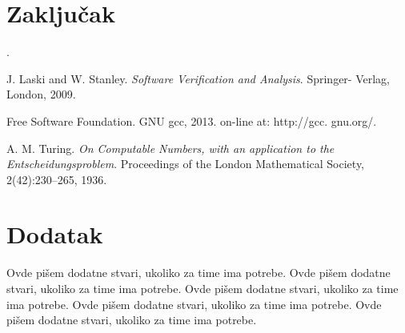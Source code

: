 \documentclass[a4paper]{article}
\begin{document}
\section{Zaključak}
\label{sec:zakljucak}

.

\newpage
{}
\appendix

\iffalse
 

\fi

\begin{thebibliography}{9}

 J. Laski and W. Stanley. \emph{Software Verification and Analysis}. Springer- Verlag, London, 2009.

 Free Software Foundation. GNU gcc, 2013. on-line at: http://gcc. gnu.org/.

 A. M. Turing. \emph{On Computable Numbers, with an application to the Entscheidungsproblem}. Proceedings of the London Mathematical Society, 2(42):230–265, 1936.


\end{thebibliography}


\appendix

\section{Dodatak}
Ovde pišem dodatne stvari, ukoliko za time ima potrebe.
Ovde pišem dodatne stvari, ukoliko za time ima potrebe.
Ovde pišem dodatne stvari, ukoliko za time ima potrebe.
Ovde pišem dodatne stvari, ukoliko za time ima potrebe.
Ovde pišem dodatne stvari, ukoliko za time ima potrebe.
\end{document}
